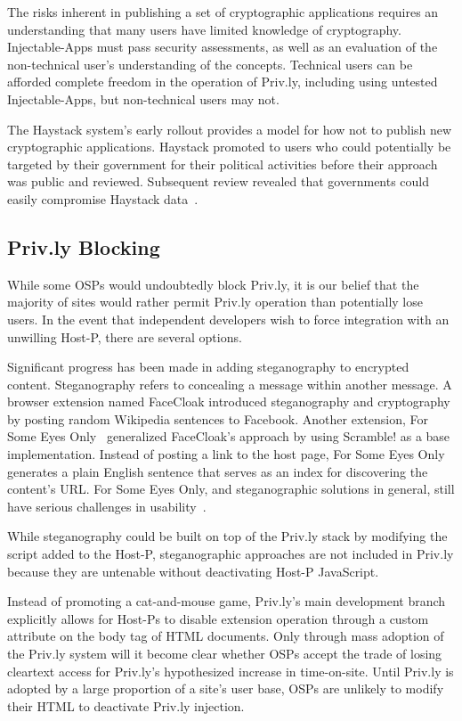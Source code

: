 \documentclass[letterpaper,twocolumn,10pt]{article}
\begin{document}
The risks inherent in publishing a set of cryptographic applications requires an understanding that many users have limited knowledge of cryptography. Injectable-Apps must 
pass security assessments, as well as an evaluation of the non-technical 
user's understanding of the concepts. Technical users can be afforded complete 
freedom in the operation of Priv.ly, including using untested Injectable-Apps, but 
non-technical users may not.

The Haystack system's early rollout provides a model for how not to publish new 
cryptographic applications. Haystack promoted to users who could potentially be 
targeted by their government for their political activities before their approach 
was public and reviewed. Subsequent review revealed that governments could easily 
compromise Haystack data~\cite{Arthur2010}.

\subsection{Priv.ly Blocking}

While some OSPs would undoubtedly block Priv.ly, it is our belief that the majority 
of sites would rather permit Priv.ly operation than potentially lose users. In the event that independent developers wish to force 
integration with an unwilling Host-P, there are several options.

Significant progress has been made in adding steganography to encrypted content. 
Steganography refers to concealing a message within another message. A browser extension named FaceCloak 
introduced steganography and cryptography by posting 
random Wikipedia sentences to Facebook. Another extension, For Some Eyes 
Only~\cite{F.BeatoI.IonS.CapkunM.Langheinrich2013} generalized FaceCloak's 
approach by using Scramble! as a base implementation. Instead of posting a link to 
the host page, For Some Eyes Only generates a plain English sentence that serves 
as an index for discovering the content's URL. For Some Eyes Only, and 
steganographic solutions in general, still have serious challenges in 
usability~\cite{F.BeatoI.IonS.CapkunM.Langheinrich2013}.

While steganography could be built on top of the Priv.ly stack by modifying the 
script added to the Host-P, steganographic approaches are not included in Priv.ly because they are untenable without deactivating Host-P JavaScript. 

Instead of promoting a cat-and-mouse game, Priv.ly's main development branch
explicitly allows for Host-Ps to disable extension 
operation through a custom attribute on the body tag of HTML documents. Only 
through mass adoption of the Priv.ly system will it become clear whether OSPs 
accept the trade of losing cleartext access for Priv.ly's hypothesized increase in time-on-site. Until Priv.ly is adopted by a large proportion of a site's user base, OSPs
are unlikely to modify their HTML to deactivate Priv.ly injection.
\end{document}
